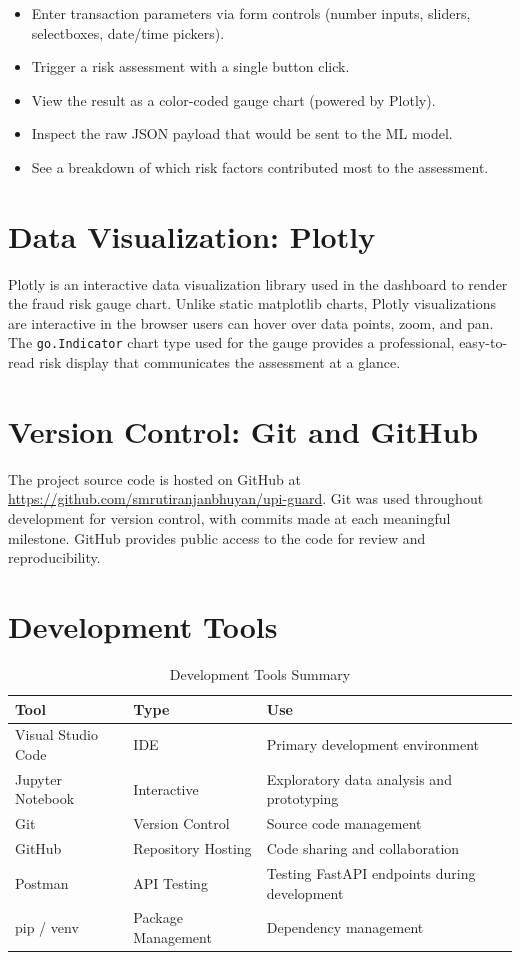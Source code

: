 \begin{itemize}
    \item Enter transaction parameters via form controls (number inputs, sliders, selectboxes, date/time pickers).
    \item Trigger a risk assessment with a single button click.
    \item View the result as a color-coded gauge chart (powered by Plotly).
    \item Inspect the raw JSON payload that would be sent to the ML model.
    \item See a breakdown of which risk factors contributed most to the assessment.
\end{itemize}

\section{Data Visualization: Plotly}

Plotly is an interactive data visualization library used in the dashboard to render the fraud risk gauge chart. Unlike static matplotlib charts, Plotly visualizations are interactive in the browser users can hover over data points, zoom, and pan. The \texttt{go.Indicator} chart type used for the gauge provides a professional, easy-to-read risk display that communicates the assessment at a glance.

\section{Version Control: Git and GitHub}

The project source code is hosted on GitHub at \url{https://github.com/smrutiranjanbhuyan/upi-guard}. Git was used throughout development for version control, with commits made at each meaningful milestone. GitHub provides public access to the code for review and reproducibility.

\section{Development Tools}

\begin{table}[H]
\centering
\caption{Development Tools Summary}
\label{tab:tools}
\begin{tabular}{|l|l|p{5.5cm}|}
\hline
\textbf{Tool} & \textbf{Type} & \textbf{Use}\\
\hline
Visual Studio Code & IDE & Primary development environment\\
\hline
Jupyter Notebook & Interactive & Exploratory data analysis and prototyping\\
\hline
Git & Version Control & Source code management\\
\hline
GitHub & Repository Hosting & Code sharing and collaboration\\
\hline
Postman & API Testing & Testing FastAPI endpoints during development\\
\hline
pip / venv & Package Management & Dependency management\\
\hline
\end{tabular}
\end{table}
